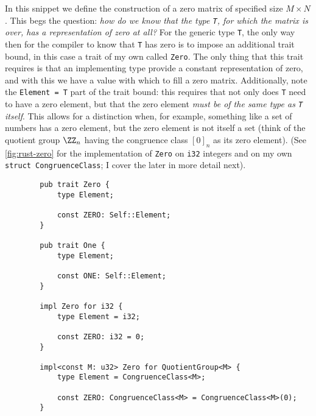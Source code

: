 \documentclass{report}
\newenvironment{code}{\captionsetup{type=listing}}{}
\begin{document}
\noindent
In this snippet we define the construction of a zero matrix of specified size
$M\times N$. This begs the question: \emph{how do we know
that the type \texttt{T}, for which the matrix is over, has a representation of zero at
all?} For the generic type \texttt{T}, the only way then for the compiler to know
that \texttt{T} has zero is to impose an additional trait bound, in this case a
trait of my own called \texttt{Zero}. The only thing that this trait requires is
that an implementing type provide a constant representation of zero, and with
this we have a value with which to fill a zero matrix. Additionally, note the
\texttt{Element = T} part of the trait bound: this requires that not only
does \texttt{T} need to have a zero element, but that the zero element \emph{must
be of the same type as \texttt{T} itself}. This allows for a distinction when, for
example, something like a set of numbers has a zero element, but the zero
element is not itself a set (think of the quotient group $\ZZ_n$ having the
congruence class $[0]_n$ as its zero element).
(See \cref{fig:rust-zero}
for the implementation of \texttt{Zero} on \texttt{i32} integers and on my own
\texttt{struct CongruenceClass}; I cover the later in more detail
next).
\begin{code}
    \begin{verbatim}
        pub trait Zero {
            type Element;

            const ZERO: Self::Element;
        }

        pub trait One {
            type Element;

            const ONE: Self::Element;
        }

        impl Zero for i32 {
            type Element = i32;

            const ZERO: i32 = 0;
        }

        impl<const M: u32> Zero for QuotientGroup<M> {
            type Element = CongruenceClass<M>;

            const ZERO: CongruenceClass<M> = CongruenceClass<M>(0);
        }
    \end{verbatim}
    \caption{%
        Definition of the zero and one traits, and the implementation of zero
        for the 32-bit integer type, and for my own quotient group type.
    }
    \label{fig:rust-zero}
\end{code}
\end{document}
